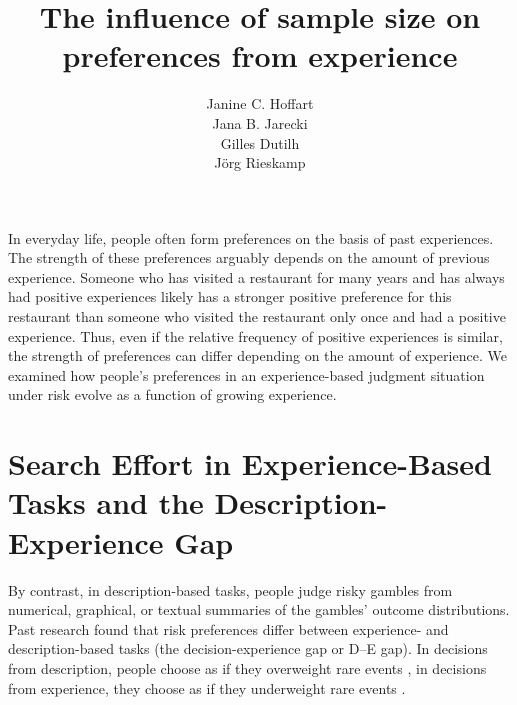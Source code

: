 \documentclass[a4paper, man, natbib, floatsintext]{apa6}
\title{The influence of sample size on preferences from experience}
\author{Janine C. Hoffart\\Jana B. Jarecki\\Gilles Dutilh\\J\"org Rieskamp}
\affiliation{University of Basel, Department of Psychology, Center for Economic Psychology}
\begin{document}
\maketitle

In everyday life, people often form preferences on the basis of past experiences. The strength of these preferences arguably depends on the amount of previous experience. Someone who has visited a restaurant for many years and has always had positive experiences likely has a stronger positive preference for this restaurant than someone who visited the restaurant only once and had a positive experience. Thus, even if the relative frequency of positive experiences is similar, the strength of preferences can differ depending on the amount of experience. We examined how people's preferences in an experience-based judgment situation under risk evolve as a function of growing experience. 


\section{Search Effort in Experience-Based Tasks and the Description-Experience Gap}
 By contrast, in description-based tasks, people judge risky gambles from numerical, graphical, or textual summaries of the gambles' outcome distributions. Past research found that risk preferences differ between experience- and description-based tasks (the decision-experience gap or D--E gap). In decisions from description, people choose as if they overweight rare events \citep{Kahneman1979}, in decisions from experience, they choose as if they underweight rare events \citep{Hertwig2004}.
\end{document}
